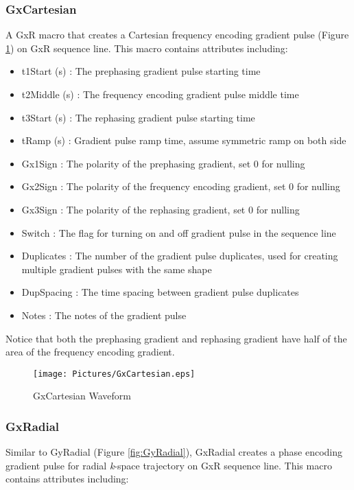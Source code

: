 \documentclass{book}%
\begin{document}
\subsubsection{GxCartesian}

A GxR macro that creates a Cartesian frequency encoding gradient pulse (Figure \ref{fig:GxCartesian}) on GxR sequence line. This macro contains attributes including:

\begin{itemize}
	\item t1Start (s) : The prephasing gradient pulse starting time
	\item t2Middle (s) : The frequency encoding gradient pulse middle time
	\item t3Start (s) : The rephasing gradient pulse starting time
	\item tRamp (s) : Gradient pulse ramp time, assume symmetric ramp on both side
	\item Gx1Sign : The polarity of the prephasing gradient, set 0 for nulling
	\item Gx2Sign : The polarity of the frequency encoding gradient, set 0 for nulling
	\item Gx3Sign : The polarity of the rephasing gradient, set 0 for nulling
	\item Switch : The flag for turning on and off gradient pulse in the sequence line
	\item Duplicates : The number of the gradient pulse duplicates, used for creating multiple gradient pulses with the same shape
	\item DupSpacing : The time spacing between gradient pulse duplicates
	\item Notes : The notes of the gradient pulse 
\end{itemize}

Notice that both the prephasing gradient and rephasing gradient have half of the area of the frequency encoding gradient.

\begin{figure}[htbp]
	\centering
		\texttt{[image: Pictures/GxCartesian.eps]}
	\caption{GxCartesian Waveform}
	\label{fig:GxCartesian}
\end{figure}		

\subsubsection{GxRadial}

Similar to GyRadial (Figure \ref{fig:GyRadial}), GxRadial creates a phase encoding gradient pulse for radial \textit{k}-space trajectory on GxR sequence line. This macro contains attributes including:
\end{document}
